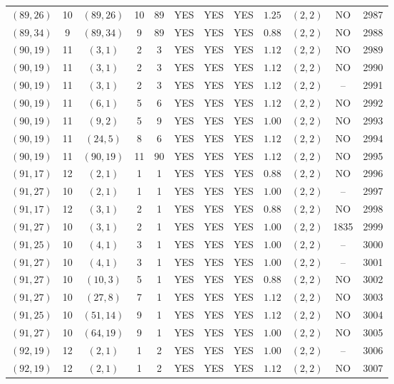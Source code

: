 \begin{longtable}{|c|c|c|c|c|c|c|c|c|c|c|c|}
$(89,26)$ & 10 & $(89,26)$ & 10 & 89 & YES & YES & YES & $1.25$ & $(2,2)$ & NO & 2987\\
$(89,34)$ & 9 & $(89,34)$ & 9 & 89 & YES & YES & YES & $0.88$ & $(2,2)$ & NO & 2988\\
$(90,19)$ & 11 & $(3,1)$ & 2 & 3 & YES & YES & YES & $1.12$ & $(2,2)$ & NO & 2989\\
$(90,19)$ & 11 & $(3,1)$ & 2 & 3 & YES & YES & YES & $1.12$ & $(2,2)$ & NO & 2990\\
$(90,19)$ & 11 & $(3,1)$ & 2 & 3 & YES & YES & YES & $1.12$ & $(2,2)$ & -- & 2991\\
$(90,19)$ & 11 & $(6,1)$ & 5 & 6 & YES & YES & YES & $1.12$ & $(2,2)$ & NO & 2992\\
$(90,19)$ & 11 & $(9,2)$ & 5 & 9 & YES & YES & YES & $1.00$ & $(2,2)$ & NO & 2993\\
$(90,19)$ & 11 & $(24,5)$ & 8 & 6 & YES & YES & YES & $1.12$ & $(2,2)$ & NO & 2994\\
$(90,19)$ & 11 & $(90,19)$ & 11 & 90 & YES & YES & YES & $1.12$ & $(2,2)$ & NO & 2995\\
$(91,17)$ & 12 & $(2,1)$ & 1 & 1 & YES & YES & YES & $0.88$ & $(2,2)$ & NO & 2996\\
$(91,27)$ & 10 & $(2,1)$ & 1 & 1 & YES & YES & YES & $1.00$ & $(2,2)$ & -- & 2997\\
$(91,17)$ & 12 & $(3,1)$ & 2 & 1 & YES & YES & YES & $0.88$ & $(2,2)$ & NO & 2998\\
$(91,27)$ & 10 & $(3,1)$ & 2 & 1 & YES & YES & YES & $1.00$ & $(2,2)$ & 1835 & 2999\\
$(91,25)$ & 10 & $(4,1)$ & 3 & 1 & YES & YES & YES & $1.00$ & $(2,2)$ & -- & 3000\\
$(91,27)$ & 10 & $(4,1)$ & 3 & 1 & YES & YES & YES & $1.00$ & $(2,2)$ & -- & 3001\\
$(91,27)$ & 10 & $(10,3)$ & 5 & 1 & YES & YES & YES & $0.88$ & $(2,2)$ & NO & 3002\\
$(91,27)$ & 10 & $(27,8)$ & 7 & 1 & YES & YES & YES & $1.12$ & $(2,2)$ & NO & 3003\\
$(91,25)$ & 10 & $(51,14)$ & 9 & 1 & YES & YES & YES & $1.12$ & $(2,2)$ & NO & 3004\\
$(91,27)$ & 10 & $(64,19)$ & 9 & 1 & YES & YES & YES & $1.00$ & $(2,2)$ & NO & 3005\\
$(92,19)$ & 12 & $(2,1)$ & 1 & 2 & YES & YES & YES & $1.00$ & $(2,2)$ & -- & 3006\\
$(92,19)$ & 12 & $(2,1)$ & 1 & 2 & YES & YES & YES & $1.12$ & $(2,2)$ & NO & 3007\\

\end{longtable}
